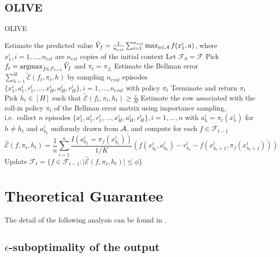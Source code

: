 \documentclass[11pt]{article}
\begin{document}
\subsection{OLIVE}
\begin{algorithm}
\caption{OLIVE}\label{olive}
\begin{algorithmic}[1]
\STATE Estimate the predicted value $\hat{V}_f=\frac{1}{n_{est}}\sum_{i=1}^{n_{est}}\max_{a\in \mathcal{A}}f(x_1^i,a)$, where $x_1^i,i=1,\ldots,n_{est}$ are $n_{est}$ copies of the initial context\label{step1}
\STATE Let $\mathcal F_0=\mathcal F$
\STATE Pick $f_t=\operatorname*{argmax}_{f\in \mathcal F_{t-1}}\hat{V}_f$ and $\pi_t=\pi_{f_t}$
\STATE Estimate the Bellman error $\sum_{h=1}^H\tilde{\mathcal{E}}(f_t,\pi_t,h)$ by sampling $n_{eval}$ episodes $\{x_1^i,a_1^i,r_1^i,\ldots,x_H^i,a_H^i,r_H^i\},i=1,\ldots,n_{eval}$ with policy $\pi_t$\label{step2}
\STATE Terminate and return $\pi_t$
\ENDIF
\STATE Pick $h_t\in[H]$ such that $\tilde{\mathcal{E}}(f_t,\pi_t,h_t)\geq \frac{\epsilon}{H}$\label{residual}
\STATE Estimate the row associated with the roll-in policy $\pi_t$ of the Bellman error matrix using importance sampling, i.e.~collect $n$ episodes $\{x_1^i,a_1^i,r_1^i,\ldots,x_H^i,a_H^i,r_H^i\},i=1,\ldots,n$ with $a_h^i=\pi_t(x_h^i)$ for $h\neq h_t$ and $a_{h_t}^i$ uniformly drawn from $\mathcal{A}$, and compute for each $f\in\mathcal F_{t-1}$
\begin{equation*}
\hat{\mathcal{E}}(f,\pi_t,h_t)=\frac{1}{n}\sum_{i=1}^n\frac{I(a_{h_t}^i=\pi_f(x_{h_t}^i))}{1/K}\left(f(x_{h_t}^i,a_{h_t}^i)-r_{h_t}^i-f(x_{h_t+1}^i,\pi_f(x_{h_t+1}^i))\right)
\end{equation*}
\label{step3}
\STATE Update $\mathcal F_t=\{f\in\mathcal F_{t-1}:\vert \hat{\mathcal{E}}(f,\pi_t,h_t) \vert \leq \phi\}$\label{updateF}
\ENDFOR
\end{algorithmic}
\end{algorithm}



\section{Theoretical Guarantee}
The detail of the following analysis can be found in \cite{jiang2016contextual}.
\subsection{$\epsilon$-suboptimality of the output}
\end{document}
